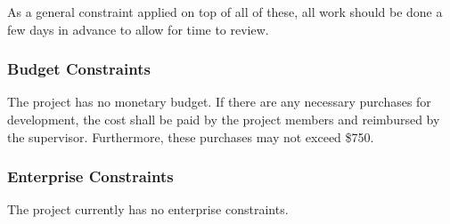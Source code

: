 \documentclass[12pt]{article}
\begin{document}
\noindent
As a general constraint applied on top of all of these, all work should be done a few days in advance to allow for time to review. 

\subsubsection{Budget Constraints}
The project has no monetary budget. If there are any necessary purchases for development, the cost
shall be paid by the project members and reimbursed by the supervisor. Furthermore, these purchases
may not exceed \$750.

\subsubsection{Enterprise Constraints}
The project currently has no enterprise constraints. 
\end{document}
